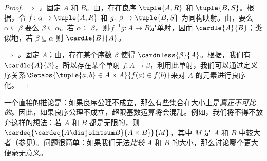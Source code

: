 \documentclass[../../../include/open-logic-section]{subfiles}
\begin{document}
\begin{proof}
\emph{ $\Rightarrow$ 。}固定 $A$ 和 $B$。由，存在良序 $\tuple{A, R}$ 和 $\tuple{B, S}$。根据，令 $f \colon \alpha \to \tuple{A, R}$ 和 $g \colon \beta \to \tuple{B, S}$ 为同构映射。由，要么 $\alpha \subseteq \beta$ 要么 $\beta \subseteq \alpha$。若 $\alpha \subseteq \beta$，则$\comp{f^{-1}}{g} \colon A \to B$是单射，因而 $\cardle{A}{B}$；类似地，若 $\beta \subseteq \alpha$ 则 $\cardle{B}{A}$。

\emph{ $\Rightarrow$ 。}固定 $A$；由，存在某个序数 $\beta$ 使得 $\cardnless{\beta}{A}$。根据，我们有 $\cardle{A}{\beta}$。所以存在某个单射 $f \colon A \to \beta$，利用此单射，我们可以通过定义序关系$\Setabs{\tuple{a, b} \in A \times A}{f(a)
\in f(b)}$来对 $A$ 的元素进行良序化。
\end{proof}
\noindent
一个直接的推论是：如果良序公理不成立，那么有些集合在大小上是\emph{真正不可比的}。因此，如果良序公理不成立，超限基数运算将会混乱。例如，我们将不得不放弃这样的想法：若 $A$ 和 $B$ 都是无限的，则$\cardeq{\cardeq{A \disjointsum B}{A \times
B}}{M}$，其中 $M$ 是 $A$ 和 $B$ 中较大者（参见）。问题很简单：如果我们无法\emph{比较} $A$ 和 $B$ 的大小，那么讨论哪个更大便毫无意义。
\end{document}
